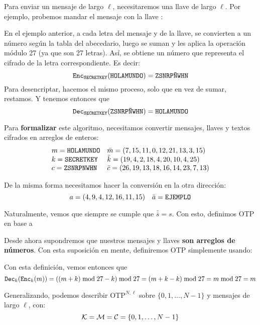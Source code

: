 Para enviar un mensaje de largo $\ell$, necesitaremos una llave de largo $\ell$. Por ejemplo, probemos mandar el mensaje  con la llave :

En el ejemplo anterior, a cada letra del mensaje y de la llave, se convierten a un número según la tabla del abecedario, luego se suman y les aplica la operación módulo 27 (ya que son 27 letras). Así, se obtiene un número que representa el cifrado de la letra correspondiente. Es decir:
$$
    \texttt{Enc}_{\texttt{SECRETKEY}}(\texttt{HOLAMUNDO}) = \texttt{ZSNRPÑWHN}
$$
Para desencriptar, hacemos el mismo proceso, solo que en vez de sumar, restamos.
Y tenemos entonces que
$$
    \texttt{Dec}_{\texttt{SECRETKEY}}(\texttt{ZSNRPÑWHN}) = \texttt{HOLAMUNDO}
$$

Para \textbf{formalizar} este algoritmo, necesitamos convertir mensajes, llaves y textos cifrados en arreglos de enteros:
$$
    \begin{array}{ll}
        m=\texttt{HOLAMUNDO} & \bar{m}=(7,15,11,0,12,21,13,3,15)    \\
        k=\texttt{SECRETKEY} & \bar{k} =(19,4,2,18,4,20,10,4,25)    \\
        c=\texttt{ZSNRPNWHN} & \bar{c} =(26,19,13,18,16,14,23,7,13)
    \end{array}
$$

De la misma forma necesitamos hacer la conversión en la otra dirección:
$$
    a=(4,9,4,12,16,11,15) \quad \bar{a}=\texttt{EJEMPLO}
$$

Naturalmente, vemos que siempre se cumple que $\bar{\bar{s}} = s$. Con esto, definimos OTP en base a

Desde ahora supondremos que nuestros mensajes y llaves \textbf{son arreglos de números}. Con esta suposición en mente, definiremos OTP simplemente usando:

Con esta definición, vemos entonces que
$$
    \texttt{Dec}_k(\texttt{Enc}_k(m)) = ((m + k) \bmod 27 - k) \bmod 27 = (m + k - k ) \bmod 27 = m \bmod 27 = m
$$

Generalizando, podemos describir $\text{OTP}^{N, \ell}$ sobre $\{0,1,\ldots, N - 1 \}$ y mensajes de largo $\ell$, con:
$$
    \mathcal{K} = \mathcal{M} = \mathcal{C} = \{0,1,\ldots, N - 1 \}
$$

